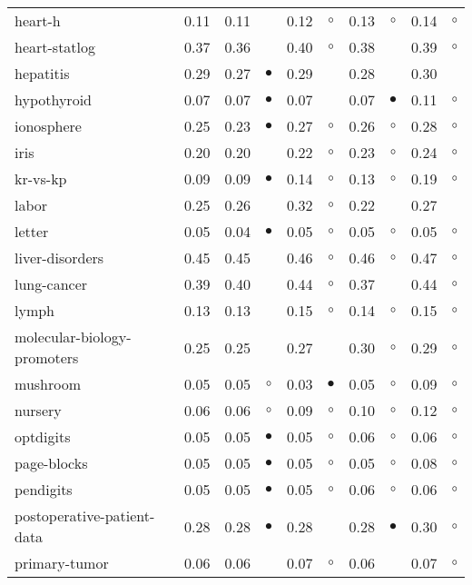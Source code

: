{\begin{longtable}{lrr@{\hspace{0.1cm}}cr@{\hspace{0.1cm}}cr@{\hspace{0.1cm}}cr@{\hspace{0.1cm}}c}
heart-h & 0.11 & 0.11 &           & 0.12 &   $\circ$ & 0.13 &   $\circ$ & 0.14 &  $\circ$\\
heart-statlog & 0.37 & 0.36 &           & 0.40 &   $\circ$ & 0.38 &           & 0.39 &  $\circ$\\
hepatitis & 0.29 & 0.27 & $\bullet$ & 0.29 &           & 0.28 &           & 0.30 &         \\
hypothyroid & 0.07 & 0.07 & $\bullet$ & 0.07 &           & 0.07 & $\bullet$ & 0.11 &  $\circ$\\
ionosphere & 0.25 & 0.23 & $\bullet$ & 0.27 &   $\circ$ & 0.26 &   $\circ$ & 0.28 &  $\circ$\\
iris & 0.20 & 0.20 &           & 0.22 &   $\circ$ & 0.23 &   $\circ$ & 0.24 &  $\circ$\\
kr-vs-kp & 0.09 & 0.09 & $\bullet$ & 0.14 &   $\circ$ & 0.13 &   $\circ$ & 0.19 &  $\circ$\\
labor & 0.25 & 0.26 &           & 0.32 &   $\circ$ & 0.22 &           & 0.27 &         \\
letter & 0.05 & 0.04 & $\bullet$ & 0.05 &   $\circ$ & 0.05 &   $\circ$ & 0.05 &  $\circ$\\
liver-disorders & 0.45 & 0.45 &           & 0.46 &   $\circ$ & 0.46 &   $\circ$ & 0.47 &  $\circ$\\
lung-cancer & 0.39 & 0.40 &           & 0.44 &   $\circ$ & 0.37 &           & 0.44 &  $\circ$\\
lymph & 0.13 & 0.13 &           & 0.15 &   $\circ$ & 0.14 &   $\circ$ & 0.15 &  $\circ$\\
molecular-biology-promoters & 0.25 & 0.25 &           & 0.27 &           & 0.30 &   $\circ$ & 0.29 &  $\circ$\\
mushroom & 0.05 & 0.05 &   $\circ$ & 0.03 & $\bullet$ & 0.05 &   $\circ$ & 0.09 &  $\circ$\\
nursery & 0.06 & 0.06 &   $\circ$ & 0.09 &   $\circ$ & 0.10 &   $\circ$ & 0.12 &  $\circ$\\
optdigits & 0.05 & 0.05 & $\bullet$ & 0.05 &   $\circ$ & 0.06 &   $\circ$ & 0.06 &  $\circ$\\
page-blocks & 0.05 & 0.05 & $\bullet$ & 0.05 &   $\circ$ & 0.05 &   $\circ$ & 0.08 &  $\circ$\\
pendigits & 0.05 & 0.05 & $\bullet$ & 0.05 &   $\circ$ & 0.06 &   $\circ$ & 0.06 &  $\circ$\\
postoperative-patient-data & 0.28 & 0.28 & $\bullet$ & 0.28 &           & 0.28 & $\bullet$ & 0.30 &  $\circ$\\
primary-tumor & 0.06 & 0.06 &           & 0.07 &   $\circ$ & 0.06 &           & 0.07 &  $\circ$\\

\end{longtable}}
